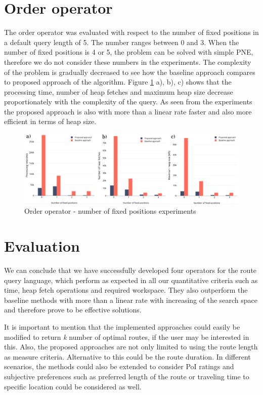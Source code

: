 \section{Order operator}
\label{sec:experimentsOrder}

The order operator was evaluated with respect to the number of fixed positions in a default query length of 5. The number ranges between 0 and 3. When the number of fixed positions is 4 or 5, the problem can be solved with simple PNE, therefore we do not consider these numbers in the experiments. The complexity of the problem is gradually decreased to see how the baseline approach compares to proposed approach of the algorithm.  
Figure \ref{fig:order} a), b), c) shows that the processing time, number of heap fetches and maximum heap size decrease proportionately with the complexity of the query. As seen from the experiments the proposed approach is also with more than a linear rate faster and also more efficient in terms of heap size.

\begin{figure}[H]
	\includegraphics[scale=0.25]{images/order.png}
	\centering
	\caption{Order operator - number of fixed positions experiments}
	\label{fig:order}
\end{figure}

\section{Evaluation}
\label{sec:eval}

We can conclude that we have successfully developed four operators for the route query language, which perform as expected in all our quantitative criteria such as time, heap fetch operations and required workspace. They also outperform the baseline methods with more than a linear rate with increasing of the search space and therefore prove to be effective solutions.

It is important to mention that the implemented approaches could easily be modified to return \textit{k} number of optimal routes, if the user may be interested in this. Also, the proposed approaches are not only limited to using the route length  as measure criteria. Alternative to this could be the route duration. In different scenarios, the methods could also be extended to consider PoI ratings and subjective preferences such as preferred length of the route or traveling time to  specific location could be considered as well.  

